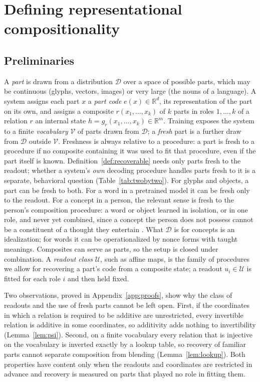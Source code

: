 \documentclass[10pt]{article}
\theoremstyle{plain}
\theoremstyle{remark}
\newcommand{\R}{\mathbb{R}}
\newcommand{\U}{\mathcal{U}}
\newcommand{\D}{\mathcal{D}}
\newcommand{\Voc}{\mathcal{V}}
\begin{document}
\section{Defining representational compositionality}
\label{sec:definition}

\subsection{Preliminaries}

A \emph{part} is drawn from a distribution $\D$ over a space of possible parts, which may be continuous (glyphs, vectors, images) or very large (the nouns of a language). A system assigns each part $x$ a \emph{part code} $e(x) \in \R^d$, its representation of the part on its own, and assigns a composite $r(x_1, \ldots, x_k)$ of $k$ parts in roles $1, \ldots, k$ of a relation $r$ an internal state $h = g_r(x_1, \ldots, x_k) \in \R^m$. Training exposes the system to a finite \emph{vocabulary} $\Voc$ of parts drawn from $\D$; a \emph{fresh} part is a further draw from $\D$ outside $\Voc$. Freshness is always relative to a procedure: a part is fresh to a procedure if no composite containing it was used to fit that procedure, even if the part itself is known. Definition~\ref{def:recoverable} needs only parts fresh to the readout; whether a system's \emph{own} decoding procedure handles parts fresh to it is a separate, behavioral question (Table~\ref{tab:twobytwo}). For glyphs and objects, a part can be fresh to both. For a word in a pretrained model it can be fresh only to the readout. For a concept in a person, the relevant sense is fresh to the person's composition procedure: a word or object learned in isolation, or in one role, and never yet combined, since a concept the person does not possess cannot be a constituent of a thought they entertain \citep{fodor2002}. What $\D$ is for concepts is an idealization; for words it can be operationalized by nonce forms with taught meanings. Composites can serve as parts, so the setup is closed under combination. A \emph{readout class} $\U$, such as affine maps, is the family of procedures we allow for recovering a part's code from a composite state; a readout $u_i \in \U$ is fitted for each role $i$ and then held fixed.

Two observations, proved in Appendix~\ref{app:proofs}, show why the class of readouts and the use of fresh parts cannot be left open. First, if the coordinates in which a relation is required to be additive are unrestricted, every invertible relation is additive in some coordinates, so additivity adds nothing to invertibility (Lemma~\ref{lem:psi}). Second, on a finite vocabulary every relation that is injective on the vocabulary is inverted exactly by a lookup table, so recovery of familiar parts cannot separate composition from blending (Lemma~\ref{lem:lookup}). Both properties have content only when the readouts and coordinates are restricted in advance and recovery is measured on parts that played no role in fitting them.
\end{document}

